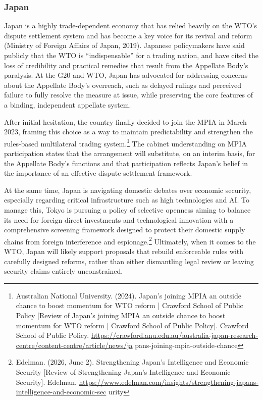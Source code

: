 \subsubsection{Japan}

Japan is a highly trade-dependent economy that has relied heavily on the WTO’s dispute settlement system and has become a key voice for its revival and reform (Ministry of Foreign Affairs of Japan, 2019). Japanese policymakers have said publicly that the WTO is “indispensable” for a trading nation, and have cited the loss of credibility and practical remedies that result from the Appellate Body’s paralysis. At the G20 and WTO, Japan has advocated for addressing concerns about the Appellate Body’s overreach, such as delayed rulings and perceived failure to fully resolve the measure at issue, while preserving the core features of a binding, independent appellate system.

After initial hesitation, the country finally decided to join the MPIA in March 2023, framing this choice as a way to maintain predictability and strengthen the rules-based multilateral trading system.\footnote{Australian National University. (2024). Japan’s joining MPIA an outside chance to boost momentum for WTO reform | Crawford School of Public Policy [Review of Japan’s joining MPIA an outside chance to boost momentum for WTO reform | Crawford School of Public Policy]. Crawford School of Public Policy. \url{https://crawford.anu.edu.au/australia-japan-research-centre/content-centre/article/news/ja} pans-joining-mpia-outside-chance} The cabinet understanding on MPIA participation states that the arrangement will substitute, on an interim basis, for the Appellate Body’s functions and that participation reflects Japan’s belief in the importance of an effective dispute-settlement framework.

At the same time, Japan is navigating domestic debates over economic security, especially regarding critical infrastructure such as high technologies and AI. To manage this, Tokyo is pursuing a policy of selective openness aiming to balance its need for foreign direct investments and technological innovation with a comprehensive screening framework designed to protect their domestic supply chains from foreign interference and espionage.\footnote{Edelman. (2026, June 2). Strengthening Japan’s Intelligence and Economic Security [Review of Strengthening Japan’s Intelligence and Economic Security]. Edelman. \url{https://www.edelman.com/insights/strengthening-japans-intelligence-and-economic-sec} urity} Ultimately, when it comes to the WTO, Japan will likely support proposals that rebuild enforceable rules with carefully designed reforms, rather than either dismantling legal review or leaving security claims entirely unconstrained.

